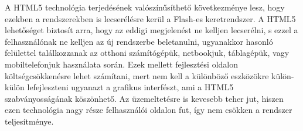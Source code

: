 A HTML5 technológia terjedésének valószínűsíthető következménye lesz, hogy ezekben a rendszerekben is lecserélésre kerül a Flash-es keretrendszer. A HTML5 lehetőséget biztosít arra, hogy az eddigi megjelenést ne kelljen lecserélni, s ezzel a felhasználónak ne kelljen az új rendszerbe beletanulni, ugyanakkor hasonló felülettel találkozzanak az otthoni számítógépük, netbookjuk, táblagépük, vagy mobiltelefonjuk használata során. Ezek mellett fejlesztési oldalon költségcsökkenésre lehet számítani, mert nem kell a különböző eszközökre külön-külön lefejleszteni ugyanazt a grafikus interfészt, ami a HTML5 szabványosságának köszönhető. Az üzemeltetésre is kevesebb teher jut, hiszen ezen technológia nagy része felhasználói oldalon fut, így nem csökken a rendszer teljesítménye.




\begin{comment}


\bibitem[ell] {link:ell}
	Ellis, Ryann K. {\it A Field Guide to Learning Management Systems}, ASTD Learning Circuits, 2009 \\ \href{http://www.astd.org/NR/rdonlyres/12ECDB99-3B91-403E-9B15-7E597444645D/23395/LMS\_fieldguide\_20091.pdf}{http://www.astd.org/NR/rdonlyres/.../LMS\_fieldguide\_20091.pdf}

\bibitem[lms] {link:lms}
	Wikipedia, {\it List of learning management systems} \\ \href{http://en.wikipedia.org/wiki/List\_of\_learning\_management\_systems}{http://en.wikipedia.org/wiki/List\_of\_learning\_management\_systems}

\end{comment}
